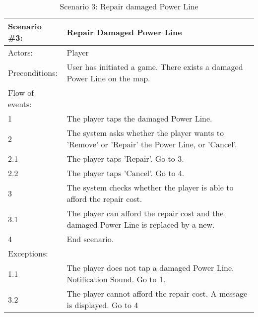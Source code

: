 \begin{table}
	\begin{tabular}{| l | p{10cm} |}
		\hline
		\rowcolor{lightgray}
		{\bf Scenario \#3:} & {\bf Repair Damaged Power Line} \\ \hline
		Actors: & Player \\ \hline
		Preconditions: & User has initiated a game. There exists a damaged Power Line on the map. \\ \hline
		\rowcolor{lightergray}
		Flow of events: & \\ \hline
		1 & The player taps the damaged Power Line. \\ \hline
		2 & The system asks whether the player wants to 'Remove' or 'Repair' the Power Line, or 'Cancel'. \\ \hline
		2.1 & The player taps 'Repair'. Go to 3. \\ \hline
		2.2 & The player taps 'Cancel'. Go to 4. \\ \hline
		3 & The system checks whether the player is able to afford the repair cost. \\ \hline
		3.1 & The player can afford the repair cost and the damaged Power Line is replaced by a new. \\ \hline
		4 & End scenario. \\ \hline
		\rowcolor{lightergray}
		Exceptions: & \\ \hline
		1.1 & The player does not tap a damaged Power Line. Notification Sound. Go to 1. \\ \hline
		3.2 & The player cannot afford the repair cost. A message is displayed. Go to 4 \\ \hline
	\end{tabular}
\caption{Scenario 3: Repair damaged Power Line}
\end{table}

